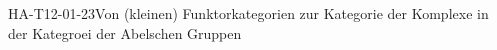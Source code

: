 
\begin{STUD}{HA-T12-01-23}{Von (kleinen) Funktorkategorien zur Kategorie der Komplexe in der Kategroei der Abelschen Gruppen}
\end{STUD}
